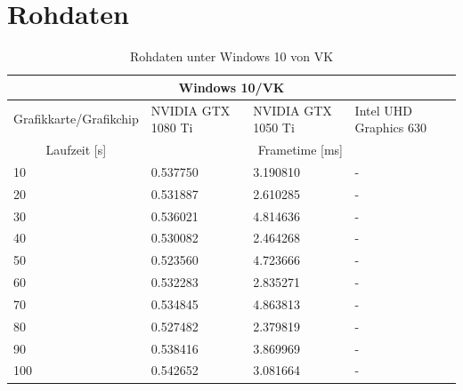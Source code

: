 \documentclass[titlepage, 11pt, a4paper, ngerman]{article}
\begin{document}
\section{Rohdaten}
\begin{table}[ht]
    \centering
    \caption[Rohdaten unter Windows 10 von VK]{Rohdaten unter Windows 10 von VK}
    \bigbreak
    \begin{tabular}{|p{4cm}||p{2.5cm}|p{2.5cm}|p{3cm}|}
    \hline
    \multicolumn{4}{|c|}{Windows 10/VK} \\
    \hline
    Grafikkarte/Grafikchip & NVIDIA GTX 1080 Ti & NVIDIA GTX 1050 Ti & Intel UHD Graphics 630 \\
    \hline
    \hline
    \multicolumn{1}{|c||}{Laufzeit [s]} & \multicolumn{3}{|c|}{\gls{Frametime} [ms]} \\
    \hline
    10 & 0.537750 & 3.190810 & - \\
    \hline
    20 & 0.531887 & 2.610285 & - \\
    \hline
    30 & 0.536021 & 4.814636 & - \\
    \hline
    40 & 0.530082 & 2.464268 & - \\
    \hline
    50 & 0.523560 & 4.723666 & - \\
    \hline
    60 & 0.532283 & 2.835271 & - \\
    \hline
    70 & 0.534845 & 4.863813 & - \\
    \hline
    80 & 0.527482 & 2.379819 & - \\
    \hline
    90 & 0.538416 & 3.869969 & - \\
    \hline
    100 & 0.542652 & 3.081664 & - \\
    \hline
    \end{tabular}
    \label{tab:results-raw-win-vk}
\end{table}
\end{document}
